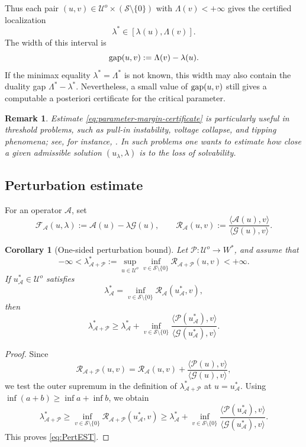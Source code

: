 \documentclass[preprint,10pt]{elsarticle}
\numberwithin{equation}{section}
\newtheorem{cor}[thm]{Corollary}
\newtheorem{rem}[thm]{Remark}
\begin{document}
Thus each pair \((u,v)\in\mathcal U^o\times(\mathcal S\setminus\{0\})\) with
\(\Lambda(v)<+\infty\) gives the certified localization
\[
\lambda^*\in[\lambda(u),\Lambda(v)].
\]
The width of this interval is
\[
{\rm gap}(u,v):=\Lambda(v)-\lambda(u).
\]
If the minimax equality \(\lambda^*=\Lambda^*\) is not known, this width may
also contain the duality gap \(\Lambda^*-\lambda^*\). Nevertheless, a small
value of \({\rm gap}(u,v)\) still gives a computable a posteriori certificate
for the critical parameter.

\begin{rem}
	Estimate \eqref{eq:parameter-margin-certificate} is particularly useful in
	threshold problems, such as pull-in instability, voltage collapse, and
	tipping phenomena; see, for instance,
	\cite{Ashwin2012,DobsonChiang,Dobson1992,PeleskoBernstein,Salazar,Scheffer2009}.
	In such problems one wants to estimate how close a given admissible
	solution \((u_\lambda,\lambda)\) is to the loss of solvability.
\end{rem}

\subsection{Perturbation estimate}

For an operator \(\mathcal A\), set
\[
\mathcal F_{\mathcal A}(u,\lambda)
:=
\mathcal A(u)-\lambda\mathcal G(u),
\qquad
\mathcal R_{\mathcal A}(u,v)
:=
\frac{\langle\mathcal A(u),v\rangle}
{\langle\mathcal G(u),v\rangle}.
\]

\begin{cor}[One-sided perturbation bound]
	\label{Th3}
	Let \(\mathcal P:\mathcal U^o\to W^*\), and assume that
	\[
	-\infty<
	\lambda^*_{\mathcal A+\mathcal P}
	:=
	\sup_{u\in\mathcal U^o}
	\inf_{v\in\mathcal S\setminus\{0\}}
	\mathcal R_{\mathcal A+\mathcal P}(u,v)
	<+\infty .
	\]
	If \(u^*_{\mathcal A}\in\mathcal U^o\) satisfies
	\[
	\lambda^*_{\mathcal A}
	=
	\inf_{v\in\mathcal S\setminus\{0\}}
	\mathcal R_{\mathcal A}(u^*_{\mathcal A},v),
	\]
	then
	\begin{equation}\label{eq:PertEST}
		\lambda^*_{\mathcal A+\mathcal P}
		\ge
		\lambda^*_{\mathcal A}
		+
		\inf_{v\in\mathcal S\setminus\{0\}}
		\frac{\langle \mathcal P(u^*_{\mathcal A}),v\rangle}
		{\langle\mathcal G(u^*_{\mathcal A}),v\rangle}.
	\end{equation}
\end{cor}

\begin{proof}
	Since
	\[
	\mathcal R_{\mathcal A+\mathcal P}(u,v)
	=
	\mathcal R_{\mathcal A}(u,v)
	+
	\frac{\langle \mathcal P(u),v\rangle}
	{\langle\mathcal G(u),v\rangle},
	\]
	we test the outer supremum in the definition of
	\(\lambda^*_{\mathcal A+\mathcal P}\) at
	\(u=u^*_{\mathcal A}\). Using
	\(\inf(a+b)\ge\inf a+\inf b\), we obtain
	\[
	\lambda^*_{\mathcal A+\mathcal P}
	\ge
	\inf_{v\in\mathcal S\setminus\{0\}}
	\mathcal R_{\mathcal A+\mathcal P}(u^*_{\mathcal A},v)
	\ge
	\lambda^*_{\mathcal A}
	+
	\inf_{v\in\mathcal S\setminus\{0\}}
	\frac{\langle \mathcal P(u^*_{\mathcal A}),v\rangle}
	{\langle\mathcal G(u^*_{\mathcal A}),v\rangle}.
	\]
	This proves \eqref{eq:PertEST}.
\end{proof}
\end{document}
